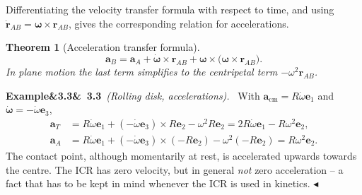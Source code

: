 \documentclass[11pt,a4paper,oneside]{report}
\numberwithin{equation}{chapter}
\newcommand{\vect}[1]{\bm{#1}}
\newcommand{\e}[1]{\vect{e}_{#1}}
\newcommand{\cm}{\mathrm{cm}}
\theoremstyle{plain}
\newtheorem{theorem}{Theorem}[chapter]
\theoremstyle{definition}
\theoremstyle{remark}
\newenvironment{example}[2]{%
  \par\addvspace{\bigskipamount}\noindent
  \textbf{Example\ifx&#1&\else~#1\fi}\ \textit{(#2).}\ \ignorespaces}%
  {\hfill$\blacktriangleleft$\par\addvspace{\bigskipamount}}
\begin{document}
Differentiating the velocity transfer formula with respect to time, and using $\dot{\vect r}_{AB}=\vect\omega\times\vect r_{AB}$,
gives the corresponding relation for accelerations.

\begin{theorem}[Acceleration transfer formula]
\begin{equation}
  \vect a_B=\vect a_A+\dot{\vect\omega}\times\vect r_{AB}+\vect\omega\times\big(\vect\omega\times\vect r_{AB}\big).
\end{equation}
In plane motion the last term simplifies to the centripetal term $-\omega^2\vect r_{AB}$.
\end{theorem}

\begin{example}{3.3}{Rolling disk, accelerations}
With $\vect a_\cm=R\dot\omega\e1$ and $\dot{\vect\omega}=-\dot\omega\e3$,
\begin{align*}
  \vect a_T&=R\dot\omega\e1+(-\dot\omega\e3)\times R\e2-\omega^2R\e2=2R\dot\omega\e1-R\omega^2\e2,\\
  \vect a_A&=R\dot\omega\e1+(-\dot\omega\e3)\times(-R\e2)-\omega^2(-R\e2)=R\omega^2\e2 .
\end{align*}
The contact point, although momentarily at rest, is accelerated upwards towards the centre. The ICR has zero velocity,
but in general \emph{not} zero acceleration -- a fact that has to be kept in mind whenever the ICR is used in kinetics.
\end{example}
\end{document}
